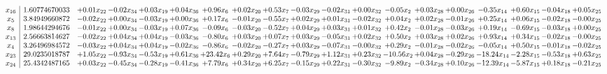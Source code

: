 \documentclass[9pt]{article}
\begin{document}
 \[\begin{array}{c| c c@{\hskip 2pt} c@{\hskip 2pt} c@{\hskip 2pt} c@{\hskip 2pt} c@{\hskip 2pt} c@{\hskip 2pt} c@{\hskip 2pt} c@{\hskip 2pt} c@{\hskip 2pt} c@{\hskip 2pt} c@{\hskip 2pt} c@{\hskip 2pt} c@{\hskip 2pt} c@{\hskip 2pt} c@{\hskip 2pt} c@{\hskip 2pt} c@{\hskip 2pt} }
 x_{16}   &  1.60774670033 & +  0.01 x_{22} & -0.02 x_{34} & +  0.03 x_{19} & +  0.04 x_{36} & +  0.96 x_{6} & +  0.02 x_{20} & +  0.53 x_{7} & -0.03 x_{29} & -0.02 x_{31} & +  0.00 x_{32} & -0.05 x_{2} & +  0.03 x_{28} & +  0.00 x_{26} & -0.35 x_{14} & +  0.60 x_{15} & -0.04 x_{18} & +  0.05 x_{25}\\
 x_{5}   &  3.84949660872 & -0.02 x_{22} & +  0.00 x_{34} & -0.03 x_{19} & +  0.00 x_{36} & +  0.17 x_{6} & -0.01 x_{20} & -0.55 x_{7} & +  0.02 x_{29} & +  0.01 x_{31} & -0.02 x_{32} & +  0.04 x_{2} & +  0.02 x_{28} & -0.01 x_{26} & +  0.25 x_{14} & +  0.06 x_{15} & -0.02 x_{18} & -0.00 x_{25}\\
 x_{8}   &  1.98644294676 & -0.01 x_{22} & +  0.00 x_{34} & -0.03 x_{19} & +  0.07 x_{36} & -0.09 x_{6} & -0.03 x_{20} & -0.52 x_{7} & +  0.04 x_{29} & +  0.03 x_{31} & +  0.01 x_{32} & +  0.42 x_{2} & -0.01 x_{28} & -0.03 x_{26} & +  0.19 x_{14} & -0.69 x_{15} & -0.03 x_{18} & +  0.00 x_{25}\\
 x_{13}   &  2.56663814627 & -0.02 x_{22} & +  0.04 x_{34} & +  0.04 x_{19} & -0.03 x_{36} & -0.80 x_{6} & +  0.03 x_{20} & +  0.07 x_{7} & +  0.03 x_{29} & -0.05 x_{31} & +  0.02 x_{32} & +  0.50 x_{2} & +  0.03 x_{28} & +  0.02 x_{26} & +  0.93 x_{14} & +  0.34 x_{15} & -0.02 x_{18} & -0.00 x_{25}\\
 x_{4}   &  3.26496984572 & -0.03 x_{22} & +  0.04 x_{34} & +  0.04 x_{19} & -0.02 x_{36} & -0.86 x_{6} & -0.02 x_{20} & -0.27 x_{7} & +  0.03 x_{29} & -0.07 x_{31} & -0.00 x_{32} & +  0.29 x_{2} & -0.01 x_{28} & -0.02 x_{26} & -0.05 x_{14} & +  0.50 x_{15} & -0.01 x_{18} & -0.02 x_{25}\\
 x_{23}   &  29.0235018787 & +  1.05 x_{22} & -0.93 x_{34} & -0.53 x_{19} & +  0.61 x_{36} & + 23.42 x_{6} & +  0.29 x_{20} & +  7.64 x_{7} & -0.79 x_{29} & +  1.12 x_{31} & +  0.23 x_{32} & -10.56 x_{2} & +  0.04 x_{28} & -0.29 x_{26} & -18.24 x_{14} & -2.28 x_{15} & -0.53 x_{18} & +  0.63 x_{25}\\
 x_{24}   &  25.4342487165 & +  0.03 x_{22} & -0.45 x_{34} & -0.28 x_{19} & -0.41 x_{36} & +  7.79 x_{6} & +  0.34 x_{20} & +  6.25 x_{7} & -0.15 x_{29} & +  0.22 x_{31} & -0.30 x_{32} & -9.89 x_{2} & -0.34 x_{28} & +  0.10 x_{26} & -12.39 x_{14} & -5.87 x_{15} & +  0.18 x_{18} & -0.21 x_{25}\\

\end{array}\]
\end{document}
